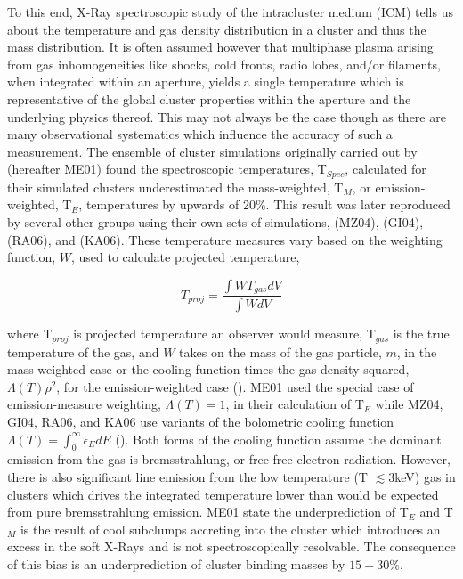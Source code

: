\documentclass[12pt, preprint]{aastex}
\begin{document}
To this end, X-Ray spectroscopic study of the intracluster medium
(ICM) tells us about the temperature and gas density distribution in a
cluster and thus the mass distribution. It is often assumed however
that multiphase plasma
arising from gas inhomogeneities like shocks, cold fronts, radio lobes, and/or
filaments, when integrated within an aperture, yields a single
temperature which is representative of
the global cluster properties within the aperture and the underlying
physics thereof. This may not
always be the case though as there are many observational systematics
which influence the accuracy of such a measurement. The ensemble of
cluster simulations originally carried out by \cite{2001ApJ...546..100M}
(hereafter ME01) found the spectroscopic temperatures, T$_{Spec}$, calculated for their
simulated clusters underestimated the mass-weighted, T$_M$, or
emission-weighted, T$_E$, temperatures by upwards of 20\%. This result was later
reproduced by several other groups using their own sets of simulations,
\cite{2004MNRAS.354...10M} (MZ04),
\cite{2004MNRAS.351..505G} (GI04), \cite{2006MNRAS.369.2013R} (RA06), and
\cite{2006astro.ph.11018K} (KA06). These temperature measures vary based on
the weighting function, $W$, used to calculate projected temperature,

\begin{equation}
T_{proj} = \frac{\int W T_{gas} dV}{\int W dV}
\end{equation}

where T$_{proj}$ is projected temperature an observer would measure,
T$_{gas}$ is the true temperature of the gas, and $W$ takes on the
mass of the gas particle, $m$, in the mass-weighted
case or the cooling function times the gas density squared,
$\Lambda(T)\rho^2$, for the emission-weighted case
(\cite{1995MNRAS.275..720N}). ME01 used the special
case of emission-measure weighting, $\Lambda(T)=1$, in their
calculation of T$_E$ while MZ04, GI04, RA06, and KA06 use variants of
the bolometric cooling function
$\Lambda(T)=\int_{0}^{\infty}\epsilon_E dE$
(\cite{1993ApJS...88..253S}). Both forms of the cooling function
assume the dominant emission from the gas is bremsstrahlung,
or free-free electron radiation. However, there is also significant
line emission from the low temperature (T $\lesssim 3$keV) gas in
clusters which drives the integrated temperature lower than would be
expected from pure bremsstrahlung emission. ME01 state the
underprediction of T$_E$ and T$_M$ is the result of cool subclumps
accreting into the cluster which introduces an excess in the soft
X-Rays and is not spectroscopically resolvable. The consequence of
this bias is an underprediction of cluster binding masses by $15-30\%$.
\end{document}
